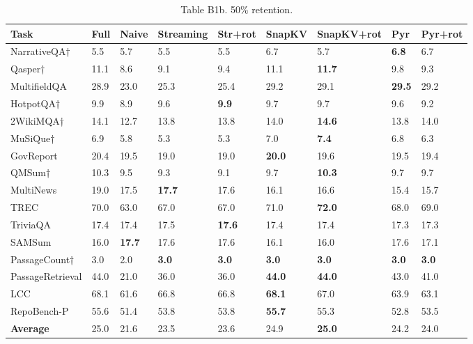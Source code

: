 \documentclass[10pt,letterpaper]{article}
\begin{document}
\begin{table}[H]
\centering
\small
\caption*{Table B1b. 50\% retention.}
\begin{tabular}{@{}lllllllll@{}}
\toprule
Task & Full & Naive & Streaming & Str+rot & SnapKV & SnapKV+rot & Pyr &
Pyr+rot\\
\midrule
    NarrativeQA† & 5.5 & 5.7 & 5.5 & 5.5 & 6.7 & 5.7 & \textbf{6.8} & 6.7\\
    Qasper† & 11.1 & 8.6 & 9.1 & 9.4 & 11.1 & \textbf{11.7} & 9.8 & 9.3\\
    MultifieldQA & 28.9 & 23.0 & 25.3 & 25.4 & 29.2 & 29.1 & \textbf{29.5} & 29.2\\
    HotpotQA† & 9.9 & 8.9 & 9.6 & \textbf{9.9} & 9.7 & 9.7 & 9.6 & 9.2\\
    2WikiMQA† & 14.1 & 12.7 & 13.8 & 13.8 & 14.0 & \textbf{14.6} & 13.8 & 14.0\\
    MuSiQue† & 6.9 & 5.8 & 5.3 & 5.3 & 7.0 & \textbf{7.4} & 6.8 & 6.3\\
    GovReport & 20.4 & 19.5 & 19.0 & 19.0 & \textbf{20.0} & 19.6 & 19.5 & 19.4\\
    QMSum† & 10.3 & 9.5 & 9.3 & 9.1 & 9.7 & \textbf{10.3} & 9.7 & 9.7\\
    MultiNews & 19.0 & 17.5 & \textbf{17.7} & 17.6 & 16.1 & 16.6 & 15.4 & 15.7\\
    TREC & 70.0 & 63.0 & 67.0 & 67.0 & 71.0 & \textbf{72.0} & 68.0 & 69.0\\
    TriviaQA & 17.4 & 17.4 & 17.5 & \textbf{17.6} & 17.4 & 17.4 & 17.3 & 17.3\\
    SAMSum & 16.0 & \textbf{17.7} & 17.6 & 17.6 & 16.1 & 16.0 & 17.6 & 17.1\\
    PassageCount† & 3.0 & 2.0 & \textbf{3.0} & \textbf{3.0} & \textbf{3.0} & \textbf{3.0} & \textbf{3.0} & \textbf{3.0}\\
    PassageRetrieval & 44.0 & 21.0 & 36.0 & 36.0 & \textbf{44.0} & \textbf{44.0} & 43.0 & 41.0\\
    LCC & 68.1 & 61.6 & 66.8 & 66.8 & \textbf{68.1} & 67.0 & 63.9 & 63.1\\
    RepoBench-P & 55.6 & 51.4 & 53.8 & 53.8 & \textbf{55.7} & 55.3 & 52.8 & 53.5\\
    \textbf{Average} & 25.0 & 21.6 & 23.5 & 23.6 & 24.9 & \textbf{25.0} & 24.2 & 24.0\\
\bottomrule
\end{tabular}
\end{table}
\end{document}
